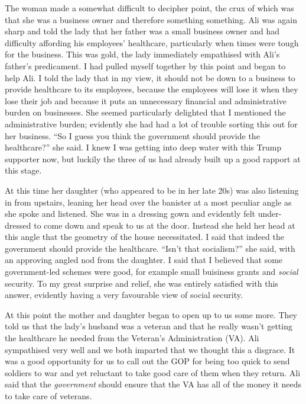 \documentclass[]{book}
\begin{document}
The woman made a somewhat difficult to decipher point, the crux of which was that she was a business owner and therefore something something. Ali was again sharp and told the lady that her father was a small business owner and had difficulty affording his employees' healthcare, particularly when times were tough for the business. This was gold, the lady immediately empathised with Ali's father's predicament. I had pulled myself together by this point and began to help Ali. I told the lady that in my view, it should not be down to a business to provide healthcare to its employees, because the employees will lose it when they lose their job and because it puts an unnecessary financial and administrative burden on businesses. She seemed particularly delighted that I mentioned the administrative burden; evidently she had had a lot of trouble sorting this out for her business. ``So I guess you think the government should provide the healthcare?'' she said. I knew I was getting into deep water with this Trump supporter now, but luckily the three of us had already built up a good rapport at this stage.

At this time her daughter (who appeared to be in her late 20s) was also listening in from upstairs, leaning her head over the banister at a most peculiar angle as she spoke and listened. She was in a dressing gown and evidently felt under-dressed to come down and speak to us at the door. Instead she held her head at this angle that the geometry of the house necessitated. I said that indeed the government should provide the healthcare. ``Isn't that socialism?'' she said, with an approving angled nod from the daughter. I said that I believed that some government-led schemes were good, for example small buisiness grants and \emph{social} security. To my great surprise and relief, she was entirely satisfied with this answer, evidently having a very favourable view of social security.

At this point the mother and daughter began to open up to us some more. They told us that the lady's husband was a veteran and that he really wasn't getting the healthcare he needed from the Veteran's Administration (VA). Ali sympathised very well and we both imparted that we thought this a disgrace. It was a good opportunity for us to call out the GOP for being too quick to send soldiers to war and yet reluctant to take good care of them when they return. Ali said that the \emph{government} should ensure that the VA has all of the money it needs to take care of veterans.
\end{document}
